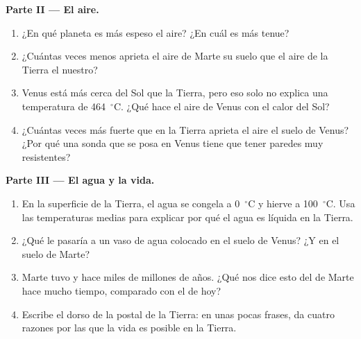\begin{problem}
\medskip
\noindent\textbf{Parte II --- El aire.}
\begin{enumerate}[resume]
  \item ¿En qué planeta es más espeso el aire? ¿En cuál es más tenue?
  \item ¿Cuántas veces menos aprieta el aire de Marte su suelo que el aire
        de la Tierra el nuestro?
  \item Venus está más cerca del Sol que la Tierra, pero eso solo no
        explica una temperatura de 464~$^\circ$C. ¿Qué hace el aire de
        Venus con el calor del Sol?
  \item ¿Cuántas veces más fuerte que en la Tierra aprieta el aire el suelo
        de Venus? ¿Por qué una sonda que se posa en Venus tiene que tener paredes muy resistentes?
\end{enumerate}

\medskip
\noindent\textbf{Parte III --- El agua y la vida.}
\begin{enumerate}[resume]
  \item En la superficie de la Tierra, el agua se congela a 0~$^\circ$C y
        hierve a 100~$^\circ$C. Usa las temperaturas medias para explicar
        por qué el agua es líquida en la Tierra.
  \item ¿Qué le pasaría a un vaso de agua colocado en el suelo de Venus?
        ¿Y en el suelo de Marte?
  \item Marte tuvo  y  hace miles de millones de años. ¿Qué nos
        dice esto del  de Marte hace mucho tiempo, comparado con el de
        hoy?
  \item Escribe el dorso de la postal de la Tierra: en unas pocas frases,
        da cuatro razones por las que la vida es posible en la Tierra.
\end{enumerate}
\end{problem}
